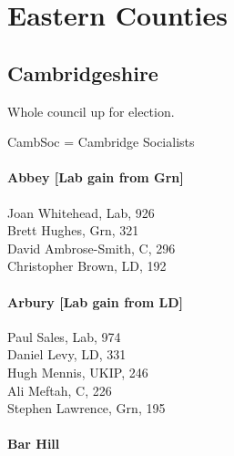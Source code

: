 \documentclass[a4paper,openany,10pt]{book}
\begin{document}
\chapter{Eastern Counties}

\section{Cambridgeshire}

Whole council up for election.

CambSoc = Cambridge Socialists



\subsubsection*{Abbey \hspace*{\fill}\nolinebreak[1]%
\enspace\hspace*{\fill}
[Lab gain from Grn]}



Joan Whitehead, Lab, 926\\
Brett Hughes, Grn, 321\\
David Ambrose-Smith, C, 296\\
Christopher Brown, LD, 192\\


\subsubsection*{Arbury \hspace*{\fill}\nolinebreak[1]%
\enspace\hspace*{\fill}
[Lab gain from LD]}



Paul Sales, Lab, 974\\
Daniel Levy, LD, 331\\
Hugh Mennis, UKIP, 246\\
Ali Meftah, C, 226\\
Stephen Lawrence, Grn, 195\\


\subsubsection*{Bar Hill}

\end{document}
